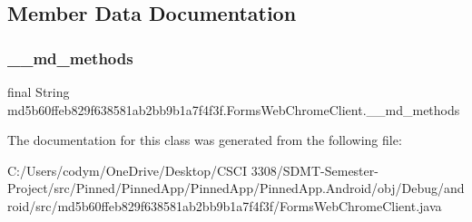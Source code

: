 \subsection{Member Data Documentation}
\mbox{\label{classmd5b60ffeb829f638581ab2bb9b1a7f4f3f_1_1_forms_web_chrome_client_acdbbbfa40f7a32b9cc6eaabbd04669e5}} 
\subsubsection{\texorpdfstring{\+\_\+\+\_\+md\+\_\+methods}{\_\_md\_methods}}
{\footnotesize\ttfamily final String md5b60ffeb829f638581ab2bb9b1a7f4f3f.\+Forms\+Web\+Chrome\+Client.\+\_\+\+\_\+md\+\_\+methods\hspace{0.3cm}{\ttfamily [static]}}



The documentation for this class was generated from the following file\+:\begin{DoxyCompactItemize}
\item 
C\+:/\+Users/codym/\+One\+Drive/\+Desktop/\+C\+S\+C\+I 3308/\+S\+D\+M\+T-\/\+Semester-\/\+Project/src/\+Pinned/\+Pinned\+App/\+Pinned\+App/\+Pinned\+App.\+Android/obj/\+Debug/android/src/md5b60ffeb829f638581ab2bb9b1a7f4f3f/Forms\+Web\+Chrome\+Client.\+java\end{DoxyCompactItemize}
